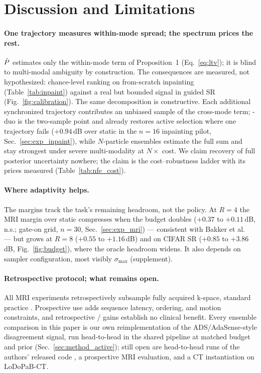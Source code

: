 \section{Discussion and Limitations}\label{sec:disc}

\paragraph{One trajectory measures within-mode spread; the spectrum
prices the rest.}
$\hat{P}$ estimates only the within-mode term of Proposition~1
(Eq.~\ref{eq:ltv}); it is blind to multi-modal ambiguity by
construction. The consequences are measured, not hypothesized:
chance-level ranking on from-scratch inpainting
(Table~\ref{tab:inpaint}) against a real but bounded signal in guided
SR (Fig.~\ref{fig:calibration})\RLOCAL. The same decomposition is
constructive. Each additional synchronized trajectory contributes an
unbiased sample of the cross-mode term; \pvas-duo is the two-sample
point and already restores active selection where one trajectory fails
($+0.94$\,dB over static in the $n{=}16$ inpainting pilot,
Sec.~\ref{sec:exp_inpaint})\RLOCAL, while $N$-particle ensembles
estimate the full sum and stay strongest under severe multi-modality at
$N\times$ cost. We claim recovery of full posterior uncertainty
nowhere; the claim is the cost--robustness ladder with its prices
measured (Table~\ref{tab:nfe_cost}).

\paragraph{Where adaptivity helps.}
The margins track the task's remaining headroom, not the policy. At
$R{=}4$ the MRI margin over static compresses when the budget doubles
($+0.37$ to $+0.11$\,dB, n.s.; gate-on grid, $n{=}30$,
Sec.~\ref{sec:exp_mri})\RLOCAL{} --- consistent with Bakker et
al.~\cite{bakker2022multicoil} --- but grows at $R{=}8$ ($+0.55$ to
$+1.16$\,dB)\RLOCAL{} and on CIFAR SR ($+0.85$ to $+3.86$\,dB,
Fig.~\ref{fig:budget})\RLOCAL, where the oracle headroom widens. It
also depends on sampler configuration, most visibly $\sigma_{\max}$
(supplement).

\paragraph{Retrospective protocol; what remains open.}
All MRI experiments retrospectively subsample fully acquired k-space,
standard practice \cite{bakker2020greedy,pineda2020rl}. Prospective use
adds sequence latency, ordering, and motion constraints, and
retrospective \psnrm{}/\ssimm{} gains establish no clinical benefit.
Every ensemble comparison in this paper is our own reimplementation of
the ADS/AdaSense-style disagreement signal, run head-to-head in the
shared pipeline at matched budget and prior
(Sec.~\ref{sec:method_active}); still open are head-to-head runs of the
authors' released code
\cite{elata2024adasense,nolan2025ads,iollo2025bedmri}, a prospective
MRI evaluation, and a CT instantiation on LoDoPaB-CT.

